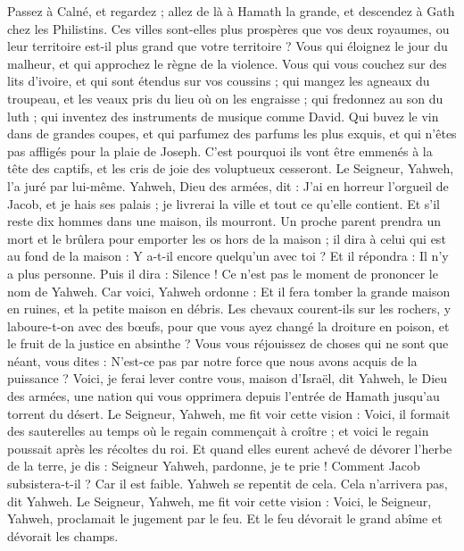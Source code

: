 \begin{multicols}{2}
Passez à Calné, et regardez ; allez de là à Hamath la grande, et descendez à Gath chez les Philistins. Ces villes sont-elles plus prospères que vos deux royaumes, ou leur territoire est-il plus grand que votre territoire ?
Vous qui éloignez le jour du malheur, et qui approchez le règne de la violence.
Vous qui vous couchez sur des lits d'ivoire, et qui sont étendus sur vos coussins ; qui mangez les agneaux du troupeau, et les veaux pris du lieu où on les engraisse ;
qui fredonnez au son du luth ; qui inventez des instruments de musique comme David.
Qui buvez le vin dans de grandes coupes, et qui parfumez des parfums les plus exquis, et qui n’êtes pas affligés pour la plaie de Joseph.
C’est pourquoi ils vont être emmenés à la tête des captifs, et les cris de joie des voluptueux cesseront.
Le Seigneur, Yahweh, l’a juré par lui-même. Yahweh, Dieu des armées, dit : J'ai en horreur l'orgueil de Jacob, et je hais ses palais ; je livrerai la ville et tout ce qu’elle contient.
Et s'il reste dix hommes dans une maison, ils mourront.
Un proche parent prendra un mort et le brûlera pour emporter les os hors de la maison ; il dira à celui qui est au fond de la maison : Y a-t-il encore quelqu'un avec toi ? Et il répondra : Il n’y a plus personne. Puis il dira : Silence ! Ce n’est pas le moment de prononcer le nom de Yahweh.
Car voici, Yahweh ordonne : Et il fera tomber la grande maison en ruines, et la petite maison en débris.
Les chevaux courent-ils sur les rochers, y laboure-t-on avec des bœufs, pour que vous ayez changé la droiture en poison, et le fruit de la justice en absinthe ?
Vous vous réjouissez de choses qui ne sont que néant, vous dites : N’est-ce pas par notre force que nous avons acquis de la puissance ?
Voici, je ferai lever contre vous, maison d’Israël, dit Yahweh, le Dieu des armées, une nation qui vous opprimera depuis l'entrée de Hamath jusqu'au torrent du désert.
\VerseOne{}Le Seigneur, Yahweh, me fit voir cette vision : Voici, il formait des sauterelles au temps où le regain commençait à croître ; et voici le regain poussait après les récoltes du roi.
Et quand elles eurent achevé de dévorer l'herbe de la terre, je dis : Seigneur Yahweh, pardonne, je te prie ! Comment Jacob subsistera-t-il ? Car il est faible.
Yahweh se repentit de cela. Cela n'arrivera pas, dit Yahweh.
Le Seigneur, Yahweh, me fit voir cette vision : Voici, le Seigneur, Yahweh, proclamait le jugement par le feu. Et le feu dévorait le grand abîme et dévorait les champs.

\end{multicols}
